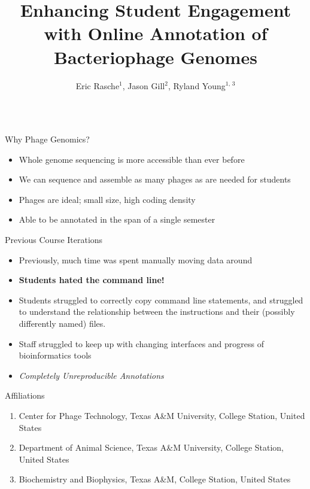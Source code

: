 \documentclass[final,t,20pt]{beamer}
\title{Enhancing Student Engagement with Online Annotation of Bacteriophage Genomes}
\author{\Huge Eric Rasche$^{\text{1}}$, Jason Gill$^{\text{2}}$, Ryland Young$^{\text{1, 3}}$}
\begin{document}
\begin{frame}[fragile]
    \begin{columns}[t]
        \begin{column}{.20\linewidth}
            \begin{block}{Why Phage Genomics?}
                \begin{itemize}
                    \item Whole genome sequencing is more accessible than
                        ever before
                    \item We can sequence and assemble as many phages as
                        are needed for students
                    \item Phages are ideal; small size, high coding
                        density
                    \item Able to be annotated in the span of a single semester
                \end{itemize}
            \end{block}

            \begin{block}{Previous Course Iterations}
                \justifying
                \begin{itemize}
                    \item Previously, much time was spent manually moving data around
                    \item \textbf{Students hated the command line!}
                    \item Students struggled to correctly copy command
                        line statements, and struggled to understand the
                        relationship between the instructions and their
                        (possibly differently named) files.
                    \item Staff struggled to keep up with changing interfaces and progress of bioinformatics tools
                    \item \emph{Completely Unreproducible Annotations}
                \end{itemize}
            \end{block}

            \begin{block}{Affiliations}
                \justifying
                \begin{enumerate}
                    \item Center for Phage Technology, Texas A\&M University, College Station, United States
                    \item Department of Animal Science, Texas A\&M University, College Station, United States
                    \item Biochemistry and Biophysics, Texas A\&M, College Station, United States
                \end{enumerate}
            \end{block}


\end{column}
\end{columns}
\end{frame}
\end{document}
